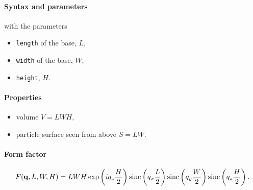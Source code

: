 \begin{figure}[h]
\hfill
{}
\hfill
{}
\hfill
\end{figure}

\FloatBarrier

\paragraph{Syntax and parameters}
\begin{quote}
\end{quote}
with the parameters
\begin{itemize}
\item \texttt{length} of the base, $L$,
\item \texttt{width} of the base, $W$,
\item \texttt{height}, $H$.
\end{itemize}

\paragraph{Properties}
\begin{itemize}
\item volume $V= LWH$,
\item particle surface seen from above $S = LW$.
\end{itemize}

\paragraph{Form factor}

\begin{equation*}
F(\mathbf{q},L,W,H)= L W H\exp\left(i q_z \frac{H}{2}\right) \operatorname{sinc}\left(q_x \frac{L}{2}\right)
\operatorname{sinc}\left(q_y \frac{W}{2}\right) \operatorname{sinc}\left(q_z \frac{H}{2}\right).
\end{equation*}


